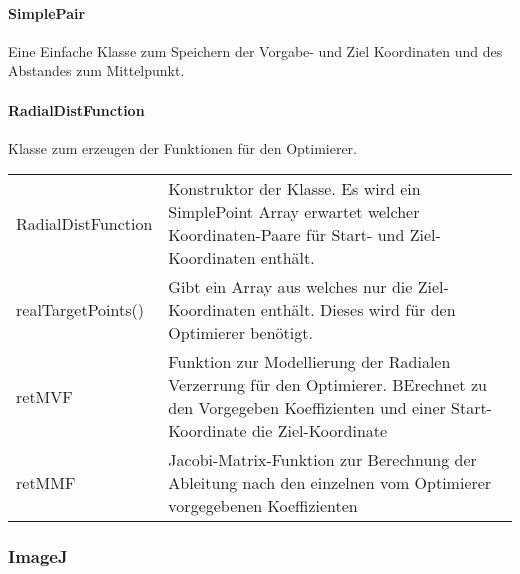 \paragraph{SimplePair}
Eine Einfache Klasse zum Speichern der Vorgabe- und Ziel Koordinaten und des Abstandes zum Mittelpunkt.

\paragraph{RadialDistFunction}
Klasse zum erzeugen der Funktionen für den Optimierer.

\begin{tabular}{p{} | p{}} 
\caption{Methoden der RadialDistFunction Klasse}
RadialDistFunction & Konstruktor der Klasse. Es wird ein SimplePoint Array erwartet welcher Koordinaten-Paare für Start- und Ziel-Koordinaten enthält.\\
realTargetPoints() & Gibt ein Array aus welches nur die Ziel-Koordinaten enthält. Dieses wird für den Optimierer benötigt.\\
retMVF & Funktion zur Modellierung der Radialen Verzerrung für den Optimierer. BErechnet zu den Vorgegeben Koeffizienten und einer Start-Koordinate die Ziel-Koordinate\\
retMMF & Jacobi-Matrix-Funktion zur Berechnung der Ableitung nach den einzelnen vom Optimierer vorgegebenen Koeffizienten \\
\end{tabular}

\subsubsection{ImageJ}
\newpage
